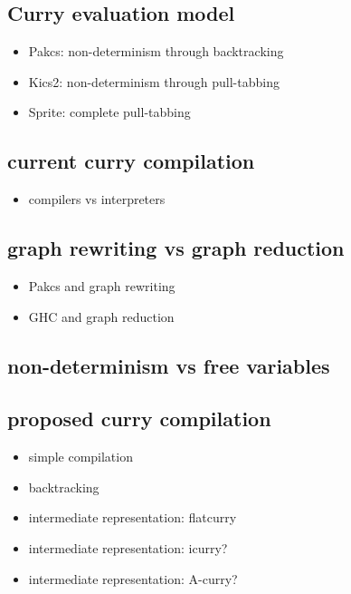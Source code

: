 
\subsection{Curry evaluation model}
\begin{itemize}
  \item Pakcs: non-determinism through backtracking
  \item Kics2: non-determinism through pull-tabbing
  \item Sprite: complete pull-tabbing
\end{itemize}
\subsection{current curry compilation}
\begin{itemize}
  \item compilers vs interpreters
\end{itemize}
\subsection{graph rewriting vs graph reduction}
\begin{itemize}
  \item Pakcs and graph rewriting
  \item GHC and graph reduction
\end{itemize}
\subsection{non-determinism vs free variables}
\subsection{proposed curry compilation}
\begin{itemize}
  \item simple compilation
  \item backtracking
  \item intermediate representation: flatcurry
  \item intermediate representation: icurry?
  \item intermediate representation: A-curry?
\end{itemize}
